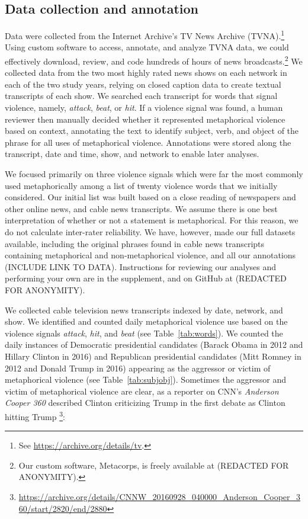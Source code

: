 
\subsection{Data collection and annotation}

Data were collected from the Internet Archive's TV News Archive
(TVNA).\footnote{See \url{https://archive.org/details/tv}.} Using custom
software to access, annotate, and analyze TVNA data, we could effectively
download, review, and code hundreds of hours of news broadcasts.\footnote{Our
custom software, Metacorps, is freely available at
(REDACTED FOR ANONYMITY).}
We collected data from the two
most highly rated news shows on each network in each of the two study years,
relying on closed caption data  to create textual transcripts of each show. We
searched each transcript for words that signal violence, namely, \emph{attack},
\emph{beat}, or \emph{hit}. If a violence signal was found, a human reviewer
then manually decided whether it represented metaphorical violence based on
context, annotating the text to identify subject, verb, and object of the phrase
for all uses of metaphorical violence. Annotations were stored along the
transcript, date and time, show, and network to enable later analyses.

We focused primarily on three violence signals which were far the most commonly
used metaphorically among a list of twenty violence words that we initially 
considered. Our initial list was built based on a close reading of newspapers 
and other online news, and cable news transcripts. We assume there is one 
best interpretation of whether or not a statement is metaphorical. For this reason,
we do not calculate inter-rater reliability. We have, however, made our 
full datasets available, including the original phrases found in cable news 
transcripts containing metaphorical and non-metaphorical violence, and all
our annotations (INCLUDE LINK TO DATA). 
Instructions for reviewing our analyses and performing your
own are in the supplement, and on GitHub at 
(REDACTED FOR ANONYMITY).

We collected cable television news transcripts indexed by date, network, and
show. We identified and counted daily metaphorical
violence use based on the violence signals \emph{attack}, \emph{hit}, and
\emph{beat} (see Table~\ref{tab:words}). We counted the daily instances of
Democratic presidential candidates (Barack Obama in 2012 and Hillary Clinton in
2016) and Republican presidential candidates (Mitt Romney in 2012 and Donald
Trump in 2016) appearing as the aggressor or victim of metaphorical violence
(see Table~\ref{tab:subjobj}). Sometimes the aggressor and victim of metaphorical 
violence are clear, as a reporter on CNN's \emph{Anderson Cooper 360}
described Clinton criticizing Trump in the first debate as Clinton hitting Trump
\footnote{\url{https://archive.org/details/CNNW_20160928_040000_Anderson_Cooper_360/start/2820/end/2880}}:

